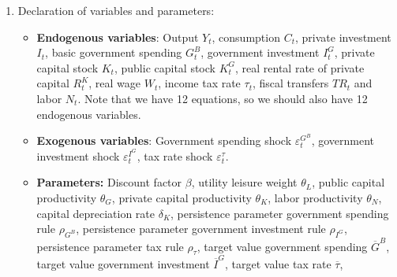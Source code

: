 \begin{enumerate}

\item
Declaration of variables and parameters:
\begin{itemize}
  \item \textbf{Endogenous variables}:
  Output \(Y_t\),
  consumption \(C_t\),
  private investment \(I_t\),
  basic government spending \(G^B_t\),
  government investment \(I_t^G\),
  private capital stock \(K_t\), 
  public capital stock \(K_t^G\),
  real rental rate of private capital \(R^K_{t}\),
  real wage \(W_t\),
  income tax rate \(\tau_t\),
  fiscal transfers \({TR}_t\)
  and labor \(N_t\).
  Note that we have 12 equations, so we should also have 12 endogenous variables.

  \item \textbf{Exogenous variables}:
  Government spending shock \(\varepsilon_t^{G^B}\),
  government investment shock \(\varepsilon_t^{I^G}\),
  tax rate shock \(\varepsilon_t^{\tau}\).

  \item \textbf{Parameters:}
  Discount factor \(\beta \),
  utility leisure weight \(\theta_L\),
  public capital productivity \(\theta_G\),
  private capital productivity \(\theta_K\),
  labor productivity \(\theta_N\),
  capital depreciation rate \(\delta_K\),
  persistence parameter government spending rule \(\rho_{G^B}\),
  persistence parameter government investment rule \(\rho_{I^G}\),
  persistence parameter tax rule \(\rho_{\tau}\),
  target value government spending \(\overline{G}^B\),
  target value government investment \(\overline{I}^G\),
  target value tax rate \(\overline{\tau}\),
\end{itemize}


\end{enumerate}
